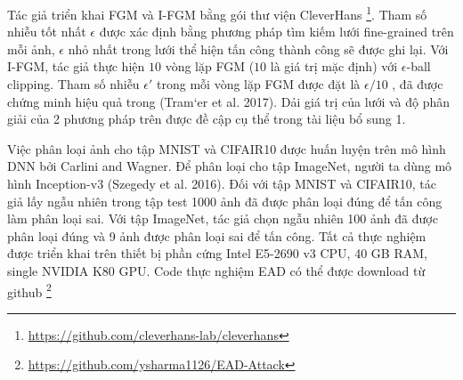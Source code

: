 Tác giả triển khai FGM và I-FGM bằng gói thư viện CleverHans \footnote{\href{https://github.com/cleverhans-lab/cleverhans}{https://github.com/cleverhans-lab/cleverhans}}. Tham số nhiễu tốt nhất $\epsilon$ được xác định bằng phương pháp tìm kiếm lưới fine-grained trên mỗi ảnh, $\epsilon$ nhỏ nhất trong lưới thể hiện tấn công thành công sẽ được ghi lại. Với I-FGM, tác giả thực hiện $10$ vòng lặp FGM ($10$ là giá trị mặc định) với $\epsilon$-ball clipping. Tham số nhiễu $\epsilon'$ trong mỗi vòng lặp FGM được đặt là $\epsilon/10$ , đã được chứng minh hiệu quả trong (Tram`er et al. 2017). Dải giá trị của lưới và độ phân giải của 2 phương pháp trên được đề cập cụ thể trong tài liệu bổ sung 1.

Việc phân loại ảnh cho tập MNIST và CIFAIR10 được huấn luyện trên mô hình DNN bởi Carlini and Wagner. Để phân loại cho tập ImageNet, người ta dùng mô hình Inception-v3 (Szegedy et al. 2016). Đối với tập MNIST và CIFAIR10, tác giả lấy ngẫu nhiên trong tập test 1000 ảnh đã được phân loại đúng để tấn công làm phân loại sai. Với tập ImageNet, tác giả chọn ngẫu nhiên 100 ảnh đã được phân loại đúng và 9 ảnh được phân loại sai để tấn công. Tất cả thực nghiệm được triển khai trên thiết bị phần cứng Intel E5-2690 v3 CPU, 40 GB RAM, single NVIDIA K80 GPU. Code thực nghiệm EAD có thể được download từ github \footnote{\href{https://github.com/ysharma1126/EAD-Attack}{https://github.com/ysharma1126/EAD-Attack}}